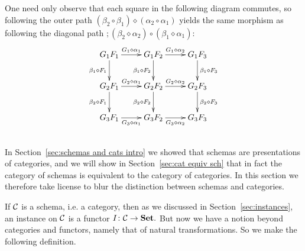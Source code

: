 \documentclass[../main/CT4S-EN-RU]{subfiles}
\begin{document}
\begin{theoremRUS}
\end{theoremRUS}

\begin{proofENG}
One need only observe that each square in the following diagram commutes, so following the outer path $(\beta_2\circ\beta_1)\diamond(\alpha_2\circ\alpha_1)$ yields the same morphism as following the diagonal path $;(\beta_2\diamond\alpha_2)\circ(\beta_1\diamond\alpha_1)$:
$$
\xymatrix{
G_1F_1\ar[r]^{G_1\diamond\alpha_1}\ar[d]_{\beta_1\diamond F_1}&G_1F_2\ar[r]^{G_1\diamond\alpha_2}\ar[d]_{\beta_1\diamond F_2}&G_1F_3\ar[d]^{\beta_1\diamond F_3}\\
G_2F_1\ar[r]^{G_2\diamond\alpha_1}\ar[d]_{\beta_2\diamond F_1}&G_2F_2\ar[r]^{G_2\diamond\alpha_2}\ar[d]_{\beta_2\diamond F_2}&G_2F_3\ar[d]^{\beta_2\diamond F_3}\\
G_3F_1\ar[r]_{G_3\diamond\alpha_1}&G_3F_2\ar[r]_{G_3\diamond\alpha_2}&G_3F_3
}
$$
\end{proofENG}

\begin{proofRUS}
\end{proofRUS}


\subsection{}

\begin{blockENG}
In Section~\ref{sec:schemas and cats intro} we showed that schemas are presentations of categories, and we will show in Section~\ref{sec:cat equiv sch} that in fact the category of schemas is equivalent to the category of categories. In this section we therefore take license to blur the distinction between schemas and categories.
\end{blockENG}

\begin{blockRUS}
\end{blockRUS}

\begin{blockENG}
If $\mathcal{C}$ is a schema, i.e. a category, then as we discussed in Section~\ref{sec:instances}, an instance on $\mathcal{C}$ is a functor $I\colon\mathcal{C}\rightarrow{\mathbf{Set}}.$ But now we have a notion beyond categories and functors, namely that of natural transformations. So we make the following definition.
\end{blockENG}
\end{document}
